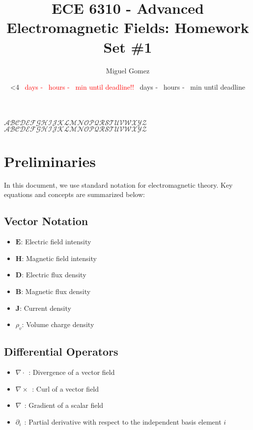 \documentclass[12pt]{article}
\newcommand{\TimeUntilDue}{
  \ifnum\daystilldue<4
    \textcolor{red}{
    \number\daystilldue\ days - 
    \number\hourstilldue\ hours - 
    \number\minutestilldue\ min until deadline!!
  }
\else
    \number\daystilldue\ days - 
    \number\hourstilldue\ hours - 
    \number\minutestilldue\ min until deadline
  \fi
}
\begin{document}
\title{ECE 6310 - Advanced Electromagnetic Fields: Homework Set \#1}
\author{Miguel Gomez}
\date{\TimeUntilDue}
\maketitle

\begin{center}
  $\mathcal{ABCDEFGHIJKLMNOPQRSTUVWXYZ}$\\
$\mathscr{ABCDEFGHIJKLMNOPQRSTUVWXYZ}$
\end{center}
\section{Preliminaries}

In this document, we use standard notation for electromagnetic theory. Key equations and concepts are summarized below:

\subsection*{Vector Notation}
\begin{itemize}
  \item $\mathbf{E}$: Electric field intensity
  \item $\mathbf{H}$: Magnetic field intensity
  \item $\mathbf{D}$: Electric flux density
  \item $\mathbf{B}$: Magnetic flux density
  \item $\mathbf{J}$: Current density
  \item $\rho_v$: Volume charge density
\end{itemize}

\subsection*{Differential Operators}
\begin{itemize}
  \item $\nabla \cdot\ \ $: Divergence of a vector field
  \item $\nabla \times\ \ $: Curl of a vector field
  \item $\nabla\ \ $: Gradient of a scalar field
  \item $\partial_i\ \ $: Partial derivative with respect to the independent basis element $i$
\end{itemize}
\end{document}
